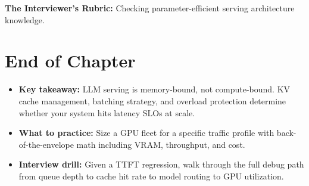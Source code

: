 \textbf{The Interviewer's Rubric:} Checking parameter-efficient serving architecture knowledge.

\section*{End of Chapter}

\begin{itemize}
  \item \textbf{Key takeaway:} LLM serving is memory-bound, not compute-bound. KV cache management, batching strategy, and overload protection determine whether your system hits latency SLOs at scale.
  \item \textbf{What to practice:} Size a GPU fleet for a specific traffic profile with back-of-the-envelope math including VRAM, throughput, and cost.
  \item \textbf{Interview drill:} Given a TTFT regression, walk through the full debug path from queue depth to cache hit rate to model routing to GPU utilization.
\end{itemize}
